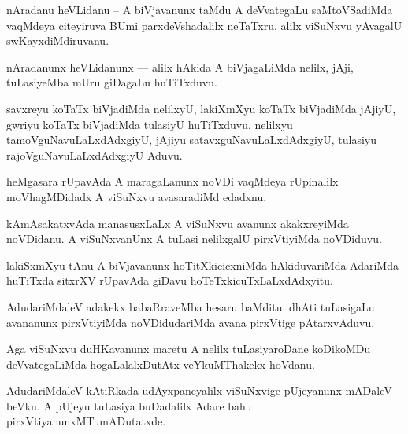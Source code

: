 \documentclass{article}
\begin{document}
\begin{mn}%
nAradanu heVLidanu -- A biVjavanunx taMdu A deVvategaLu saMtoVSadiMda vaqMdeya citeyiruva BUmi 
parxdeVshadalilx neTaTxru. alilx viSuNxvu yAvagalU swKayxdiMdiruvanu.
\end{mn}


\begin{mn}%
nAradanunx heVLidanunx --- alilx hAkida A biVjagaLiMda nelilx, jAji, tuLasiyeMba mUru giDagaLu 
huTiTxduvu.
\end{mn}

\begin{mn}%
savxreyu koTaTx biVjadiMda nelilxyU, lakiXmXyu koTaTx biVjadiMda jAjiyU, gwriyu koTaTx biVjadiMda 
tulasiyU huTiTxduvu. nelilxyu tamoVguNavuLaLxdAdxgiyU, jAjiyu satavxguNavuLaLxdAdxgiyU, tulasiyu 
rajoVguNavuLaLxdAdxgiyU Aduvu.
\end{mn}

\begin{mn}%
heMgasara rUpavAda A maragaLanunx noVDi vaqMdeya rUpinalilx moVhagMDidadx A viSuNxvu avasaradiMd 
edadxnu.
\end{mn}

\begin{mn}%
kAmAsakatxvAda manasusxLaLx A viSuNxvu avanunx akakxreyiMda noVDidanu. A viSuNxvanUnx A tuLasi 
nelilxgalU pirxVtiyiMda noVDiduvu.
\end{mn}

\begin{mn}%
lakiSxmXyu tAnu A biVjavanunx hoTitXkicicxniMda hAkiduvariMda AdariMda huTiTxda sitxrXV rUpavAda 
giDavu hoTeTxkicuTxLaLxdAdxyitu.
\end{mn}

\begin{mn}%
AdudariMdaleV adakekx babaRraveMba hesaru baMditu. dhAti tuLasigaLu avananunx pirxVtiyiMda 
noVDidudariMda avana pirxVtige pAtarxvAduvu.
\end{mn}

\begin{mn}%
Aga viSuNxvu duHKavanunx maretu A nelilx tuLasiyaroDane koDikoMDu deVvategaLiMda hogaLalalxDutAtx 
veYkuMThakekx hoVdanu.
\end{mn}

\begin{mn}%
AdudariMdaleV kAtiRkada udAyxpaneyalilx viSuNxvige pUjeyanunx mADaleV beVku. A pUjeyu tuLasiya 
buDadalilx Adare bahu pirxVtiyanunxMTumADutatxde.
\end{mn}
\end{document}
